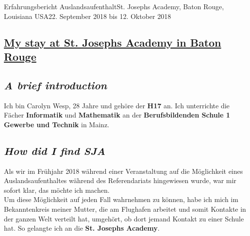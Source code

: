 \documentclass[oneside,openany,headings=optiontotoc,11pt,numbers=noenddot]{article}
\begin{document}
				
	\begin{worksheet}{Erfahrungsbericht Auslandsaufenthalt}{St. Joseph\grq{}s Academy, Baton Rouge, Louisiana USA}{22. September 2018 bis 12. Oktober 2018}
		\begin{center}
			\section*{\underline{My stay at St. Joseph\grq{}s Academy in Baton Rouge}}
		\end{center}
		\setcounter{section}{1}
		\subsection*{\textit{A brief introduction}}
		Ich bin Carolyn Wesp, 28 Jahre und gehöre der \textbf{H17} an. Ich unterrichte die Fächer \textbf{Informatik} und \textbf{Mathematik} an der \textbf{Berufsbildenden Schule 1 Gewerbe und Technik} in Mainz.
		\subsection*{\textit{How did I find SJA}}
		Als wir im Frühjahr 2018 während einer Veranstaltung auf die Möglichkeit eines Auslandsaufenthaltes während des Referendariats hingewiesen wurde, war mir sofort klar, das möchte ich machen.\\
		Um diese Möglichkeit auf jeden Fall wahrnehmen zu können, habe ich mich im Bekanntenkreis meiner Mutter, die am Flughafen arbeitet und somit Kontakte in der ganzen Welt verteilt hat, umgehört, ob dort jemand Kontakt zu einer Schule hat. So gelangte ich an die \textbf{St. Joseph\grq{}s Academy}.

\end{worksheet}
\end{document}
